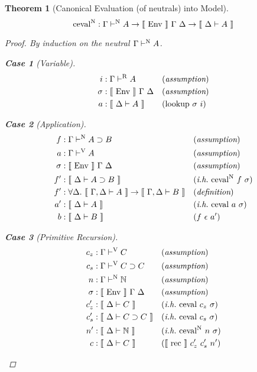 \documentclass{llncs}
\newtheorem{subtheorem}{Theorem}
\newtheorem{scase}{Case}
\def\arr{\supset}
\def\marr{\rightarrow}
\def\nat{\mathbb{N}}
\def\emp{\epsilon}
\def\rec{\fun{rec}}
\def\cevalv{\fun{ceval}}
\def\cevaln{\fun{ceval}^\con{N}}
\def\lookup{\fun{lookup}}
\def\bydef{(\textit{definition})}
\def\byass{(\textit{assumption})}
\newcommand{\ih}[1]{(\textit{i.h.}~ #1)}
\newcommand{\by}[1]{(#1)}
\newcommand{\turn}[1]{\vdash^\con{#1}}
\newcommand{\all}[1]{\forall#1.~}
\newcommand{\el}[1]{\llbracket ~ #1 ~ \rrbracket}
\newcommand{\con}[1]{\textmd{#1}}
\newcommand{\fun}[1]{\textmd{#1}}
\newcommand{\dtypm}[1]{\el{\Delta \vdash #1}}
\newcommand{\gdtypm}[1]{\el{\Gamma, \Delta \vdash #1}}
\newcommand{\typv}[1]{\Gamma \turn{V} #1}
\newcommand{\typn}[1]{\Gamma \turn{N} #1}
\newcommand{\typr}[1]{\Gamma \turn{R} #1}
\def\menv{\el{\fun{Env}}~\Gamma~\Delta}
\begin{document}
\begin{subtheorem}[Canonical Evaluation (of neutrals) into Model]
\label{thm:mod:cevaln}
$$
\cevaln : \typn{A} \marr \menv \marr \dtypm{A}
$$

\begin{proof}

By induction on the neutral $\typn{A}$.

\begin{scase}[Variable]
\begin{align*}
i   &: \typr{A} && \byass\\
\sigma  &: \menv && \byass\\
a  &: \dtypm{A} && \by{\lookup~\sigma~i}
\end{align*}
\end{scase}

\begin{scase}[Application]
\begin{align*}
f   &: \typn{A \arr B} && \byass\\
a   &: \typv{A} && \byass\\
\sigma  &: \menv && \byass\\
f'  &: \dtypm{A \arr B} && \ih{\cevaln~f~\sigma}\\
f'  &: \all{\Delta} \gdtypm{A} \marr \gdtypm{B} && \bydef\\
a'  &: \dtypm{A} && \ih{\cevalv~a~\sigma}\\
b   &: \dtypm{B} && \by{f~\emp~a'}
\end{align*}
\end{scase}

\begin{scase}[Primitive Recursion]
\begin{align*}
c_z  &: \typv{C} && \byass\\
c_s  &: \typv{C \arr C} && \byass\\
n    &: \typn{\nat} && \byass\\
\sigma  &: \menv && \byass\\
c_z' &: \dtypm{C} && \ih{\cevalv~c_z~\sigma}\\
c_s' &: \dtypm{C \arr C} && \ih{\cevalv~c_s~\sigma}\\
n'   &: \dtypm{\nat} && \ih{\cevaln~n~\sigma}\\
c    &: \dtypm{C} && \by{\el{\rec}~c_z'~c_s'~n'}
\end{align*}
\end{scase}

\end{proof}



\end{subtheorem}
\end{document}
